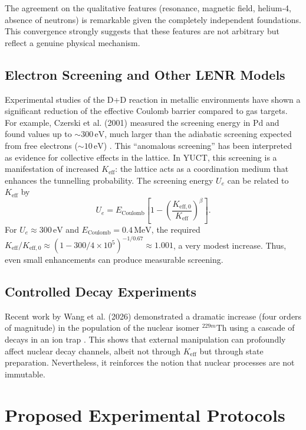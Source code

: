 \documentclass[12pt]{article}
\theoremstyle{remark}
\newcommand{\Keff}{K_{\mathrm{eff}}}
\newcommand{\Keffzero}{K_{\mathrm{eff},0}}
\begin{document}
	The agreement on the qualitative features (resonance, magnetic field, helium‑4, absence of neutrons) is remarkable given the completely independent foundations. This convergence strongly suggests that these features are not arbitrary but reflect a genuine physical mechanism.
	
	\subsection{Electron Screening and Other LENR Models}
	
	Experimental studies of the D+D reaction in metallic environments have shown a significant reduction of the effective Coulomb barrier compared to gas targets. For example, Czerski et al. (2001) measured the screening energy in Pd and found values up to \(\sim 300\,\text{eV}\), much larger than the adiabatic screening expected from free electrons (\(\sim 10\,\text{eV}\)) . This “anomalous screening” has been interpreted as evidence for collective effects in the lattice. In YUCT, this screening is a manifestation of increased \(\Keff\): the lattice acts as a coordination medium that enhances the tunnelling probability. The screening energy \(U_e\) can be related to \(\Keff\) by
	\begin{equation}
		U_e = E_{\text{Coulomb}} \left[1 - \left(\frac{\Keffzero}{\Keff}\right)^{\beta}\right].
	\end{equation}
	For \(U_e \approx 300\,\text{eV}\) and \(E_{\text{Coulomb}} = 0.4\,\text{MeV}\), the required \(\Keff/\Keffzero \approx (1 - 300/4\times10^5)^{-1/0.67} \approx 1.001\), a very modest increase. Thus, even small enhancements can produce measurable screening.
	
	\subsection{Controlled Decay Experiments}
	
	Recent work by Wang et al. (2026) demonstrated a dramatic increase (four orders of magnitude) in the population of the nuclear isomer \(^{229m}\)Th using a cascade of decays in an ion trap . This shows that external manipulation can profoundly affect nuclear decay channels, albeit not through \(\Keff\) but through state preparation. Nevertheless, it reinforces the notion that nuclear processes are not immutable.
	
	\section{Proposed Experimental Protocols}
	\label{sec:experiments}
	
\end{document}
